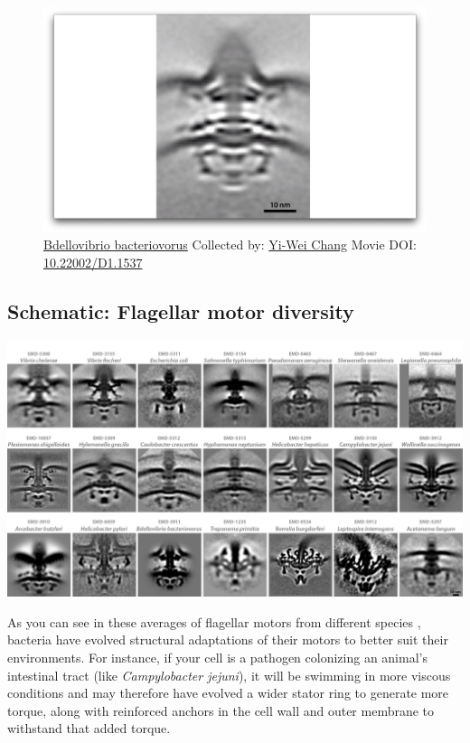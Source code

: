 \documentclass[]{tufte-book}
\begin{document}
\begin{figure}
\includegraphics{movie_stills/6_2a} \caption[\protect\hyperlink{tree}{Bdellovibrio bacteriovorus}
Collected by: \protect\hyperlink{yi-wei_chang}{Yi-Wei Chang} Movie DOI:
\href{https://doi.org/10.22002/D1.1537}{10.22002/D1.1537}]{\protect\hyperlink{tree}{Bdellovibrio bacteriovorus}
Collected by: \protect\hyperlink{yi-wei_chang}{Yi-Wei Chang} Movie DOI:
\href{https://doi.org/10.22002/D1.1537}{10.22002/D1.1537}}\label{fig:6-2a}
\end{figure}

\hypertarget{Flagellar_motor_diversity}{\subsection*{Schematic:
Flagellar motor diversity}\label{Flagellar_motor_diversity}}

\includegraphics{img/schematics/6_2_1}

As you can see in these averages of flagellar motors from different
species \citep{murphy2006} \citep{chen2011} \citep{zhao2014}
\citep{beeby2016} \citep{qin2017} \citep{chaban2018} \citep{kaplan2019}
\citep{ferreira2019} \citep{chang2019}, bacteria have evolved structural
adaptations of their motors to better suit their environments. For
instance, if your cell is a pathogen colonizing an animal's intestinal
tract (like \emph{Campylobacter jejuni}), it will be swimming in more
viscous conditions and may therefore have evolved a wider stator ring to
generate more torque, along with reinforced anchors in the cell wall and
outer membrane to withstand that added torque.
\end{document}

